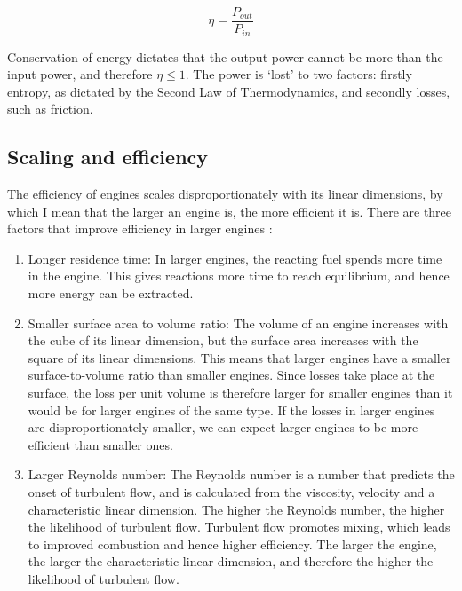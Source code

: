 \begin{equation}
\eta = \frac{P_{out}}{P_{in}}
\label{eqn:efficiency}
\end{equation}

Conservation of energy dictates that the output power cannot be more than the
input power, and therefore \(\eta \leq 1\). The power is `lost' to two factors:
firstly entropy, as dictated by the Second Law of Thermodynamics, and secondly
losses, such as friction.

\subsection{Scaling and efficiency} \label{par:scaling}

The efficiency of engines scales disproportionately with its linear dimensions,
by which I mean that the larger an engine is, the more efficient it is. There
are three factors that improve efficiency in larger engines \autocite{Brown2017}:

\begin{enumerate}

\item Longer residence time: In larger engines, the reacting fuel spends more
time in the engine. This gives reactions more time to reach equilibrium, and
hence more energy can be extracted.

\item Smaller surface area to volume ratio: The volume of an engine increases
with the cube of its linear dimension, but the surface area increases with the
square of its linear dimensions. This means that larger engines have a smaller
surface-to-volume ratio than smaller engines. Since losses take place at the
surface, the loss per unit volume is therefore larger for smaller engines than
it would be for larger engines of the same type. If the losses in larger engines
are disproportionately smaller, we can expect larger engines to be more
efficient than smaller ones. 
  
\item Larger Reynolds number: The Reynolds number is a number that predicts the
onset of turbulent flow, and is calculated from the viscosity, velocity and a
characteristic linear dimension.  The higher the Reynolds number, the higher the
likelihood of turbulent flow. Turbulent flow promotes mixing, which leads to
improved combustion and hence higher efficiency. The larger the engine, the
larger the characteristic linear dimension, and therefore the higher the
likelihood of turbulent flow.

\end{enumerate}

